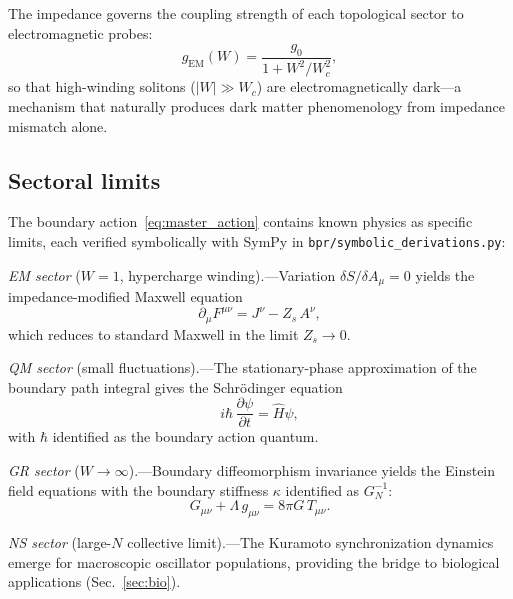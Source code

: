 \documentclass[aps,prd,twocolumn,superscriptaddress,longbibliography,nofootinbib]{revtex4-2}
\newcommand{\Wc}{W_{\!c}}
\begin{document}
The impedance governs the coupling strength of each topological
sector to electromagnetic probes:
\begin{equation}
g_{\mathrm{EM}}(W) = \frac{g_0}{1 + W^2/\Wc^2},
\label{eq:em_coupling}
\end{equation}
so that high-winding solitons ($|W| \gg \Wc$) are
electromagnetically dark---a mechanism that naturally produces dark
matter phenomenology from impedance mismatch alone.

\subsection{Sectoral limits}

The boundary action~\eqref{eq:master_action} contains known physics
as specific limits, each verified symbolically with SymPy in
\texttt{bpr/symbolic\_derivations.py}:

\textit{EM sector} ($W = 1$, hypercharge winding).---Variation
$\delta S / \delta A_\mu = 0$ yields the impedance-modified Maxwell
equation
\begin{equation}
\partial_\mu F^{\mu\nu} = J^\nu - Z_s\, A^\nu,
\label{eq:maxwell}
\end{equation}
which reduces to standard Maxwell in the limit $Z_s \to 0$.

\textit{QM sector} (small fluctuations).---The stationary-phase
approximation of the boundary path integral gives the Schr\"odinger
equation
\begin{equation}
i\hbar\, \frac{\partial\psi}{\partial t} = \hat{H}\psi,
\label{eq:schrodinger}
\end{equation}
with $\hbar$ identified as the boundary action quantum.

\textit{GR sector} ($W \to \infty$).---Boundary diffeomorphism
invariance yields the Einstein field equations with the boundary
stiffness $\kappa$ identified as $G_N^{-1}$:
\begin{equation}
G_{\mu\nu} + \Lambda\, g_{\mu\nu} = 8\pi G\, T_{\mu\nu}.
\label{eq:einstein}
\end{equation}

\textit{NS sector} (large-$N$ collective limit).---The Kuramoto
synchronization dynamics emerge for macroscopic oscillator
populations, providing the bridge to biological applications
(Sec.~\ref{sec:bio}).


\end{document}
